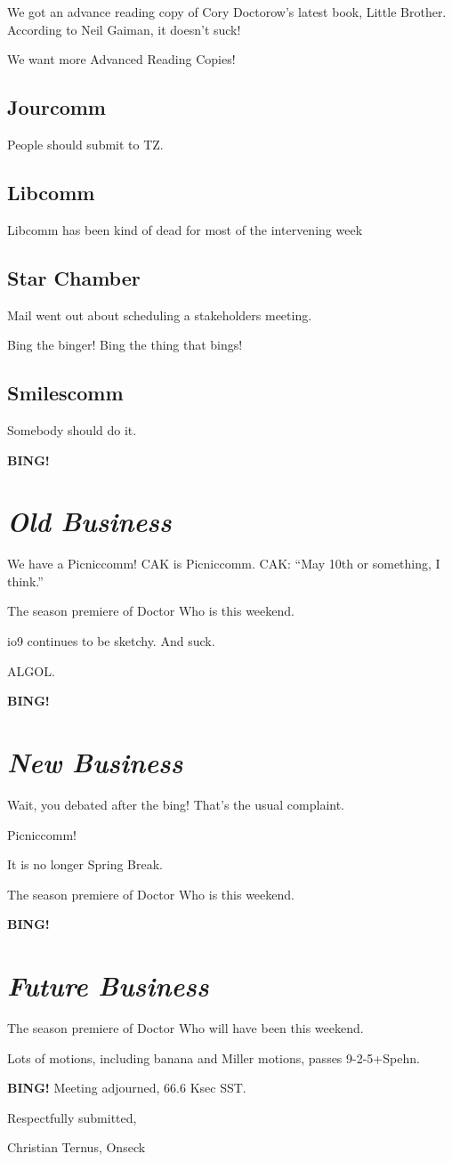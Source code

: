 \documentclass[10pt]{article}
\newcommand{\bing}{{\bf BING!} }
\newcommand{\goto}[1]{\bing \vskip 12pt \section*{{\em{#1}}}}
\begin{document}
We got an advance reading copy of Cory Doctorow's latest book, Little
Brother.  According to Neil Gaiman, it doesn't suck!

We want more Advanced Reading Copies!

\subsection*{Jourcomm}

People should submit to TZ.

\subsection*{Libcomm}

Libcomm has been kind of dead for most of the intervening week

\subsection*{Star Chamber}

Mail went out about scheduling a stakeholders meeting.

Bing the binger!  Bing the thing that bings!

\subsection*{Smilescomm}

Somebody should do it.

\goto{Old Business}

We have a Picniccomm!  CAK is Picniccomm.  CAK: ``May 10th or something, I think.''

The season premiere of Doctor Who is this weekend.

io9 continues to be sketchy.  And suck.

ALGOL.

\goto{New Business}

Wait, you debated after the bing!  That's the usual complaint.

Picniccomm!

It is no longer Spring Break.

The season premiere of Doctor Who is this weekend.

\goto{Future Business}

The season premiere of Doctor Who will have been this weekend.

Lots of motions, including banana and Miller motions, passes 9-2-5+Spehn.

\bing
\noindent
Meeting adjourned, 66.6 Ksec SST.

\vspace{18pt}

\centerline{Respectfully submitted,}
\centerline{Christian Ternus, Onseck}
\end{document}
